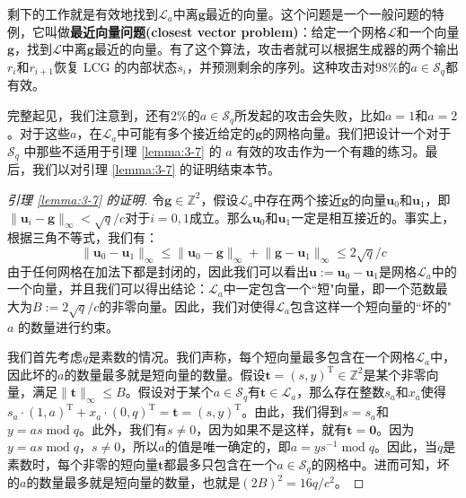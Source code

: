 剩下的工作就是有效地找到$\mathcal{L}_a$中离$\boldsymbol{g}$最近的向量。这个问题是一个一般问题的特例，它叫做\textbf{最近向量问题(closest vector problem)}：给定一个网格$\mathcal{L}$和一个向量$\boldsymbol{g}$，找到$\mathcal{L}$中离$\boldsymbol{g}$最近的向量。有了这个算法，攻击者就可以根据生成器的两个输出$r_i$和$r_{i+1}$恢复 LCG 的内部状态$s_i$，并预测剩余的序列。这种攻击对$98\%$的$a\in\mathcal{S}_q$都有效。

完整起见，我们注意到，还有$2\%$的$a\in\mathcal{S}_q$所发起的攻击会失败，比如$a=1$和$a=2$。对于这些$a$，在$\mathcal{L}_a$中可能有多个接近给定的$\boldsymbol{g}$的网格向量。我们把设计一个对于 $\mathcal{S}_q$ 中那些不适用于引理 \ref{lemma:3-7} 的 $a$ 有效的攻击作为一个有趣的练习。最后，我们以对引理 \ref{lemma:3-7} 的证明结束本节。

\begin{proof}[引理 \ref{lemma:3-7} 的证明]
令$\boldsymbol{g}\in\mathbb{Z}^2$，假设$\mathcal{L}_a$中存在两个接近$\boldsymbol{g}$的向量$\boldsymbol{u}_0$和$\boldsymbol{u}_1$，即$\lVert\boldsymbol{u}_i-\boldsymbol{g}\rVert_\infty<\sqrt{q}/c$对于$i=0,1$成立。那么$\boldsymbol{u}_0$和$\boldsymbol{u}_1$一定是相互接近的。事实上，根据三角不等式，我们有：
\[
\lVert\boldsymbol{u}_0-\boldsymbol{u}_1\rVert_\infty\leq\lVert\boldsymbol{u}_0-\boldsymbol{g}\rVert_\infty+\lVert\boldsymbol{g}-\boldsymbol{u}_1\rVert_\infty\leq2\sqrt{q}/c
\]
由于任何网格在加法下都是封闭的，因此我们可以看出$\boldsymbol{u}:=\boldsymbol{u}_0-\boldsymbol{u}_1$是网格$\mathcal{L}_a$中的一个向量，并且我们可以得出结论：$\mathcal{L}_a$中一定包含一个``短"向量，即一个范数最大为$B:= 2\sqrt{q}/c$的非零向量。因此，我们对使得$\mathcal{L}_a$包含这样一个短向量的``坏的" $a$ 的数量进行约束。

我们首先考虑$q$是素数的情况。我们声称，每个短向量最多包含在一个网格$\mathcal{L}_a$中，因此坏的$a$的数量最多就是短向量的数量。假设$\boldsymbol{t}=(s,y)^\mathrm{T}\in\mathbb{Z}^2$是某个非零向量，满足$\lVert\boldsymbol{t}\rVert_\infty\leq B$。假设对于某个$a\in\mathcal{S}_q$有$\boldsymbol{t}\in\mathcal{L}_a$，那么存在整数$s_a$和$x_a$使得$s_a\cdot(1,a)^\mathrm{T}+x_a\cdot(0,q)^\mathrm{T}=\boldsymbol{t}=(s,y)^\mathrm{T}$。由此，我们得到$s=s_a$和$y=as\;\mathrm{mod}\;q$。此外，我们有$s\neq0$，因为如果不是这样，就有$\boldsymbol{t}=\boldsymbol{0}$。因为$y=as\;\mathrm{mod}\;q$，$s\neq0$，所以$a$的值是唯一确定的，即$a=ys^{-1}\;\mathrm{mod}\;q$。因此，当$q$是素数时，每个非零的短向量$\boldsymbol{t}$都最多只包含在一个$a\in\mathcal{S}_q$的网格中。进而可知，坏的$a$的数量最多就是短向量的数量，也就是$(2B)^2=16q/c^2$。


\end{proof}
